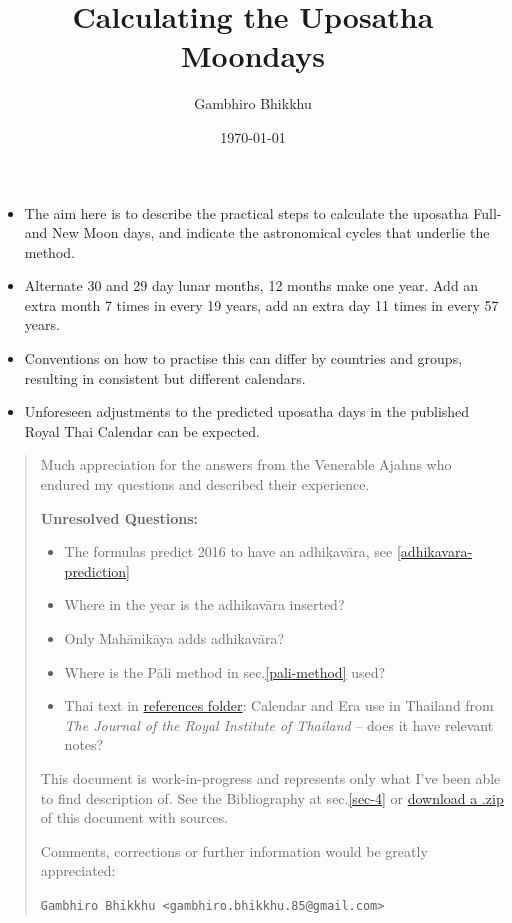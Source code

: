 \documentclass[11pt,oneside]{memoir-article}
\author{Gambhiro Bhikkhu}
\date{\today}
\title{Calculating the Uposatha Moondays}
\begin{document}
\maketitle
\begin{tldr}
\begin{itemize}
\item The aim here is to describe the practical steps to calculate the
uposatha Full- and New Moon days, and indicate the astronomical
cycles that underlie the method.
\item Alternate 30 and 29 day lunar months, 12 months make one year. Add
an extra month 7 times in every 19 years, add an extra day 11 times
in every 57 years.
\item Conventions on how to practise this can differ by countries and
groups, resulting in consistent but different calendars.
\item Unforeseen adjustments to the predicted uposatha days in the
published Royal Thai Calendar can be expected.
\end{itemize}
\end{tldr}

\begin{quote}
Much appreciation for the answers from the Venerable Ajahns who
endured my questions and described their experience.

\textbf{Unresolved Questions:}

\begin{itemize}
\item The formulas predict 2016 to have an adhikavāra, see \ref{adhikavara-prediction}
\item Where in the year is the adhikavāra inserted?
\item Only Mahānikāya adds adhikavāra?
\item Where is the Pāli method in sec.\ref{pali-method} used?
\item Thai text in \href{https://github.com/profound-labs/calculating-the-uposatha-moondays/tree/master/references}{references folder}: Calendar and Era use in Thailand
from \emph{The Journal of the Royal Institute of Thailand} -- does it
have relevant notes?
\end{itemize}

This document is work-in-progress and represents only what I've been
able to find description of. See the Bibliography at sec.\ref{sec-4}
or \href{https://github.com/profound-labs/calculating-the-uposatha-moondays/archive/master.zip}{download a .zip} of this document with sources.

Comments, corrections or further information would be greatly
appreciated:

\texttt{Gambhiro Bhikkhu <gambhiro.bhikkhu.85@gmail.com>}
\end{quote}
\end{document}
